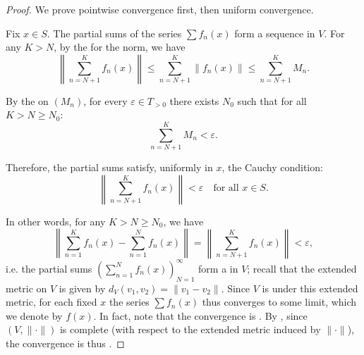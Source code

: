 \begin{proof}
    We prove pointwise convergence first, then uniform convergence.

    Fix $x \in S$. The partial sums of the series $\sum f_n(x)$ form a sequence in $V$. For any $K > N$, by the  for the norm, we have
    $$\left\|\sum_{n=N+1}^K f_n(x)\right\| \le \sum_{n=N+1}^K \|f_n(x)\| \leq \sum_{n=N+1}^K M_n.$$

    By the  on $(M_n)$, for every $\varepsilon \in T_{>0}$ there exists $N_0$ such that for all $K > N \ge N_0$:
    $$\sum_{n=N+1}^K M_n < \varepsilon.$$

    Therefore, the partial sums satisfy, uniformly in $x$, the Cauchy condition:
    $$\left\|\sum_{n=N+1}^K f_n(x)\right\| < \varepsilon \quad \text{for all } x \in S.$$

    In other words, for any $K > N \geq N_0$, we have
    $$\left\|\sum_{n=1}^K f_n(x) - \sum_{n=1}^N f_n(x)\right\| = \left\|\sum_{n=N+1}^K f_n(x)\right\| < \varepsilon,$$
    i.e. the partial sums $(\sum_{n=1}^N f_n(x))_{N=1}^\infty$ form a  in $V$; recall that the extended metric on $V$ is given by $d_V(v_1,v_2) = \|v_1-v_2\|$. Since $V$ is  under this extended metric, for each fixed $x$ the series $\sum f_n(x)$ thus converges to some limit, which we denote by $f(x)$. In fact, note that the convergence is . By , since $(V, \|\cdot\|)$ is complete (with respect to the extended metric induced by $\|\cdot\|$), the convergence is thus .
\end{proof}
